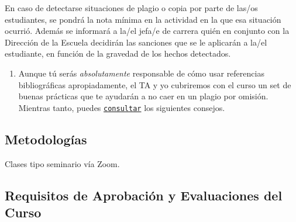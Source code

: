\documentclass[letterpaper]{article}
\begin{document}
En caso de detectarse situaciones de plagio o copia por parte de las/os estudiantes, se pondr\'a la nota m\'inima en la actividad en la que esa situaci\'on ocurri\'o. Adem\'as se informar\'a a la/el jefa/e de carrera qui\'en en conjunto con la Direcci\'on de la Escuela decidir\'an las sanciones que se le aplicar\'an a la/el estudiante, en funci\'on de la gravedad de los hechos detectados.

	
	\begin{enumerate}
		\item[{\color{red}\Pointinghand}] Aunque t\'u ser\'as \emph{absolutamente} responsable de c\'omo usar referencias bibliogr\'aficas apropiadamente, el TA y yo cubriremos con el curso un set de buenas pr\'acticas que te ayudar\'an a no caer en un plagio por omisi\'on. Mientras tanto, puedes \href{https://www.extension.harvard.edu/resources-policies/resources/avoiding-plagiarism}{\texttt{consultar}} los siguientes consejos.
	\end{enumerate}




\subsection*{Metodolog\'ias}

Clases tipo seminario v\'ia Zoom.

\subsection*{Requisitos de Aprobaci\'on y Evaluaciones del Curso}
\end{document}
